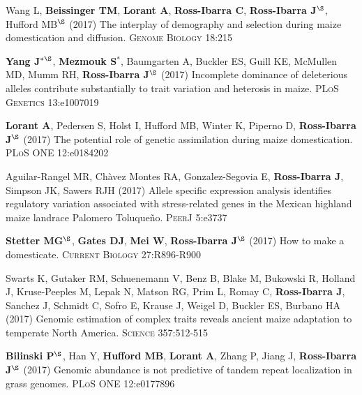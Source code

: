 \documentclass[letterpaper,10pt]{article}
\begin{document}
\begin{etaremune}
\item Wang L, \textbf{Beissinger TM}, \textbf{Lorant A}, \textbf{Ross-Ibarra C}, \textbf{Ross-Ibarra J}$^\S$, Hufford MB$^\S$ (2017) The interplay of demography and selection during maize domestication and diffusion. \textsc{Genome Biology} 18:215

\item {\bf Yang J}$^{*\S}$, {\bf Mezmouk S}$^*$, Baumgarten A, Buckler ES, Guill KE, McMullen MD, Mumm RH, {\bf Ross-Ibarra J}$^\S$ (2017) Incomplete dominance of deleterious alleles contribute substantially to trait variation and heterosis in maize. \textsc{PLoS Genetics} 13:e1007019

\item \textbf{Lorant A}, Pedersen S, Holst I, Hufford MB, Winter K, Piperno D, \textbf{Ross-Ibarra J}$^\S$ (2017) The potential role of genetic assimilation during maize domestication. \textsc{PLoS ONE} 12:e0184202

\item Aguilar-Rangel MR, Ch\`{a}vez Montes RA,  Gonzalez-Segovia E, \textbf{Ross-Ibarra J}, Simpson JK, Sawers RJH (2017) Allele specific expression analysis identifies regulatory variation associated with stress-related genes in the Mexican highland maize landrace Palomero Toluque\~{n}o. \textsc{PeerJ} 5:e3737

\item   {\bf Stetter MG}$^\S$, {\bf Gates DJ}, {\bf Mei W}, {\bf Ross-Ibarra J}$^\S$ (2017) How to make a domesticate. \textsc{Current Biology} 27:R896-R900

\item Swarts K, Gutaker RM,   Schuenemann V,  Benz B,  Blake M, Bukowski R, Holland J, Kruse-Peeples M, Lepak N, Matson RG, Prim L, Romay C, {\bf Ross-Ibarra J}, Sanchez J, Schmidt C,  Sofro E,  Krause J,  Weigel D,  Buckler ES,  Burbano HA (2017) Genomic estimation of complex traits reveals ancient maize adaptation to temperate North America. \textsc{Science} 357:512-515

\item {\bf Bilinski P}$^\S$, Han Y, {\bf Hufford MB}, {\bf Lorant A}, Zhang P, Jiang J, {\bf Ross-Ibarra J}$^\S$ (2017) Genomic abundance is not predictive of tandem repeat localization in grass genomes. \textsc{PLoS ONE} 12:e0177896


\end{etaremune}
\end{document}
